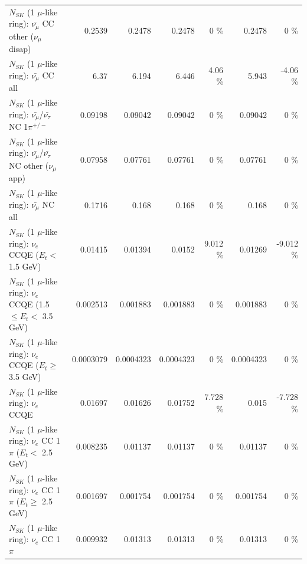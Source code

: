 \begin{table}
\begin{tabular}{| l | r | r | r  r | r  r |}
        $N_{SK}$ (1 $\mu$-like ring): $\bar{\nu_\mu}$ CC other ($\nu_\mu$ disap) &          0.2539 &          0.2478 &          0.2478 &        0 \%  &          0.2478 &        0 \%  \\ 
                          $N_{SK}$ (1 $\mu$-like ring): $\bar{\nu_{\mu}}$ CC all &            6.37 &           6.194 &           6.446 &     4.06 \%  &           5.943 &    -4.06 \%  \\ 
\hline
  $N_{SK}$ (1 $\mu$-like ring): $\bar{\nu_\mu}$/$\bar{\nu_\tau}$ NC 1$\pi^{+/-}$ &         0.09198 &         0.09042 &         0.09042 &        0 \%  &         0.09042 &        0 \%  \\ 
$N_{SK}$ (1 $\mu$-like ring): $\bar{\nu_\mu}$/$\bar{\nu_\tau}$ NC other ($\nu_\mu$ app) &         0.07958 &         0.07761 &         0.07761 &        0 \%  &         0.07761 &        0 \%  \\ 
                          $N_{SK}$ (1 $\mu$-like ring): $\bar{\nu_{\mu}}$ NC all &          0.1716 &           0.168 &           0.168 &        0 \%  &           0.168 &        0 \%  \\ 
\hline
\hline
\hline
                  $N_{SK}$ (1 $\mu$-like ring): $\nu_e$ CCQE ($E_{t} <$ 1.5 GeV) &         0.01415 &         0.01394 &          0.0152 &    9.012 \%  &         0.01269 &   -9.012 \%  \\ 
         $N_{SK}$ (1 $\mu$-like ring): $\nu_e$ CCQE (1.5 $\leq E_{t} <$ 3.5 GeV) &        0.002513 &        0.001883 &        0.001883 &        0 \%  &        0.001883 &        0 \%  \\ 
               $N_{SK}$ (1 $\mu$-like ring): $\nu_e$ CCQE ($E_{t} \geq$ 3.5 GeV) &       0.0003079 &       0.0004323 &       0.0004323 &        0 \%  &       0.0004323 &        0 \%  \\ 
\hline
                                      $N_{SK}$ (1 $\mu$-like ring): $\nu_e$ CCQE &         0.01697 &         0.01626 &         0.01752 &    7.728 \%  &           0.015 &   -7.728 \%  \\ 
\hline
             $N_{SK}$ (1 $\mu$-like ring): $\nu_e$ CC 1$\pi$ ($E_{t} <$ 2.5 GeV) &        0.008235 &         0.01137 &         0.01137 &        0 \%  &         0.01137 &        0 \%  \\ 
          $N_{SK}$ (1 $\mu$-like ring): $\nu_e$ CC 1$\pi$ ($E_{t} \geq$ 2.5 GeV) &        0.001697 &        0.001754 &        0.001754 &        0 \%  &        0.001754 &        0 \%  \\ 
\hline
                                 $N_{SK}$ (1 $\mu$-like ring): $\nu_e$ CC 1$\pi$ &        0.009932 &         0.01313 &         0.01313 &        0 \%  &         0.01313 &        0 \%  \\ 

\end{tabular}
\end{table}
